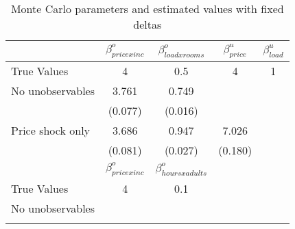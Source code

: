 \begin{table}[!ht]
	\centering
		\caption{Monte Carlo parameters and estimated values with fixed deltas}
\begin{tabular}{lcccc}
		\toprule
               &     $\beta^o_{price x inc}$ & $\beta^o_{load x rooms}$ & $\beta^u_{price}$ & $\beta^u_{load}$ \\
		\midrule
		True Values&   4&  0.5 & 4 & 1 \\
		No unobservables & 3.761 & 0.749& & \\
		& (0.077) & (0.016) & & \\
		Price shock only & 3.686 & 0.947 & 7.026 \\
		& (0.081) & (0.027) & (0.180) \\
		\midrule 
		&     $\beta^o_{price x inc}$ & $\beta^o_{hours x adults}$ &  &  \\
		\midrule
		True Values & 4 & 0.1 & &  \\
		No unobservables &  &  & & \\
		 &  &  & & \\
		\bottomrule
	\end{tabular}
\end{table}